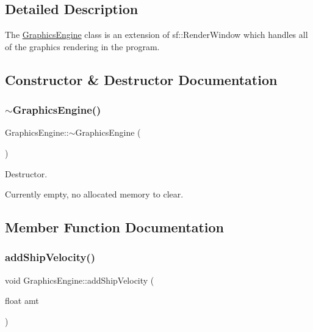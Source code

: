 \subsection{Detailed Description}
The \hyperlink{class_graphics_engine}{Graphics\+Engine} class is an extension of sf\+::\+Render\+Window which handles all of the graphics rendering in the program. 

\subsection{Constructor \& Destructor Documentation}
\mbox{\label{class_graphics_engine_ab67afeefbc9f1c284f6ce310c31ae8f6}} 
\subsubsection{\texorpdfstring{$\sim$\+Graphics\+Engine()}{~GraphicsEngine()}}
{\footnotesize\ttfamily Graphics\+Engine\+::$\sim$\+Graphics\+Engine (\begin{DoxyParamCaption}{ }\end{DoxyParamCaption})}



Destructor. 

Currently empty, no allocated memory to clear. 

\subsection{Member Function Documentation}
\mbox{\label{class_graphics_engine_a6c66ec6d03e94e31a3d9c2f7247e1f28}} 
\subsubsection{\texorpdfstring{add\+Ship\+Velocity()}{addShipVelocity()}}
{\footnotesize\ttfamily void Graphics\+Engine\+::add\+Ship\+Velocity (\begin{DoxyParamCaption}\item[{float}]{amt }\end{DoxyParamCaption})}



